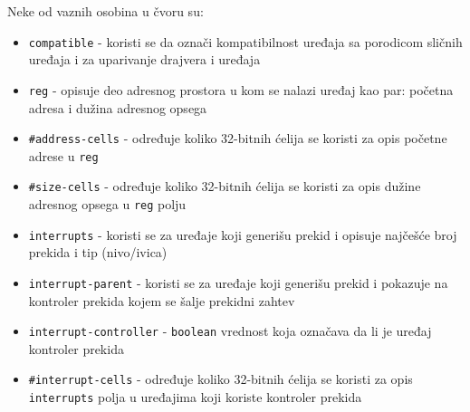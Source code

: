 Neke od vaznih osobina u čvoru su:
\begin{itemize}
\item \texttt{compatible} - koristi se da označi kompatibilnost uređaja sa porodicom sličnih uređaja i za uparivanje drajvera i uređaja
\item \texttt{reg} - opisuje deo adresnog prostora u kom se nalazi uređaj kao par: početna adresa i dužina adresnog opsega
\item \texttt{\#address-cells} - određuje koliko 32-bitnih ćelija se koristi za opis početne adrese u \texttt{reg}
\item \texttt{\#size-cells} - određuje koliko 32-bitnih ćelija se koristi za opis dužine adresnog opsega u \texttt{reg} polju
\item \texttt{interrupts} - koristi se za uređaje koji generišu prekid i opisuje najčešće broj prekida i tip (nivo/ivica)
\item \texttt{interrupt-parent} - koristi se za uređaje koji generišu prekid i pokazuje na kontroler prekida kojem se šalje prekidni zahtev
\item \texttt{interrupt-controller} - \texttt{boolean} vrednost koja označava da li je uređaj kontroler prekida
\item \texttt{\#interrupt-cells} - određuje koliko 32-bitnih ćelija se koristi za opis \texttt{interrupts} polja u uređajima koji koriste kontroler prekida
\end{itemize}

